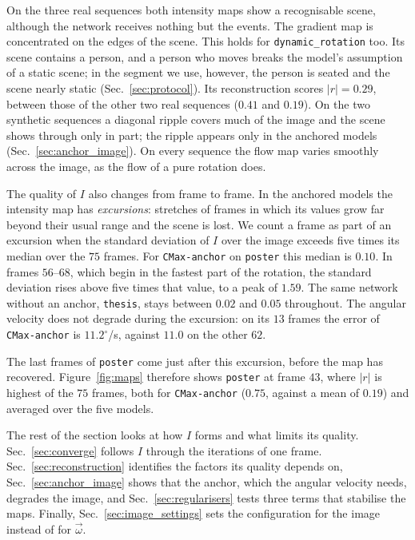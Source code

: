 \documentclass[journal]{IEEEtran}
\newcommand{\Imap}{I}
\newcommand{\wvec}{\vec{\omega}}
\begin{document}
On the three real sequences both intensity maps show a recognisable scene, although the network receives nothing but the events. The gradient map is concentrated on the edges of the scene. This holds for \texttt{dynamic\_rotation} too. Its scene contains a person, and a person who moves breaks the model's assumption of a static scene; in the segment we use, however, the person is seated and the scene nearly static (Sec.~\ref{sec:protocol}). Its reconstruction scores $|r| = 0.29$, between those of the other two real sequences ($0.41$ and $0.19$). On the two synthetic sequences a diagonal ripple covers much of the image and the scene shows through only in part; the ripple appears only in the anchored models (Sec.~\ref{sec:anchor_image}). On every sequence the flow map varies smoothly across the image, as the flow of a pure rotation does.

The quality of $\Imap$ also changes from frame to frame. In the anchored models the intensity map has \emph{excursions}: stretches of frames in which its values grow far beyond their usual range and the scene is lost. We count a frame as part of an excursion when the standard deviation of $\Imap$ over the image exceeds five times its median over the $75$ frames. For \texttt{CMax-anchor} on \texttt{poster} this median is $0.10$. In frames $56$--$68$, which begin in the fastest part of the rotation, the standard deviation rises above five times that value, to a peak of $1.59$. The same network without an anchor, \texttt{thesis}, stays between $0.02$ and $0.05$ throughout. The angular velocity does not degrade during the excursion: on its $13$ frames the error of \texttt{CMax-anchor} is $11.2^\circ$/s, against $11.0$ on the other $62$.

The last frames of \texttt{poster} come just after this excursion, before the map has recovered. Figure~\ref{fig:maps} therefore shows \texttt{poster} at frame $43$, where $|r|$ is highest of the $75$ frames, both for \texttt{CMax-anchor} ($0.75$, against a mean of $0.19$) and averaged over the five models.

The rest of the section looks at how $\Imap$ forms and what limits its quality. Sec.~\ref{sec:converge} follows $\Imap$ through the iterations of one frame. Sec.~\ref{sec:reconstruction} identifies the factors its quality depends on, Sec.~\ref{sec:anchor_image} shows that the anchor, which the angular velocity needs, degrades the image, and Sec.~\ref{sec:regularisers} tests three terms that stabilise the maps. Finally, Sec.~\ref{sec:image_settings} sets the configuration for the image instead of for $\wvec$.
\end{document}
